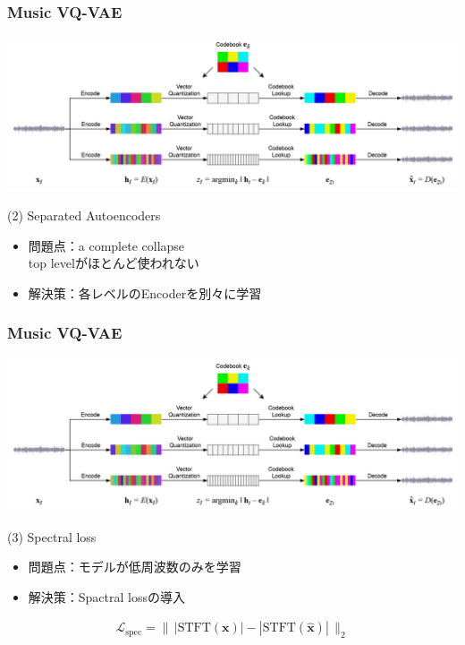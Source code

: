 \documentclass[dvipdfmx]{beamer}
\begin{document}
\begin{frame}
    \frametitle{Music VQ-VAE}
    \begin{center}
        \includegraphics[scale=0.20]{figure/musicvqvae.png}
    \end{center}

    (2) Separated Autoencoders
    \begin{itemize}
        \item 問題点：a complete collapse \\
        top levelがほとんど使われない
        \item 解決策：各レベルのEncoderを別々に学習
    \end{itemize}
\end{frame}


\begin{frame}
    \frametitle{Music VQ-VAE}
    \begin{center}
        \includegraphics[scale=0.20]{figure/musicvqvae.png}
    \end{center}

    (3) Spectral loss
    \begin{itemize}
        \item 問題点：モデルが低周波数のみを学習
        \item 解決策：Spactral lossの導入
    \end{itemize}
    \begin{align*}
        \mathcal{L}_{\mathrm{spec}} = \| \, | \mathrm{STFT}(\bm{x}) | - | \mathrm{STFT}(\hat{\bm{x}}) | \, \|_2
    \end{align*}
\end{frame}
\end{document}
